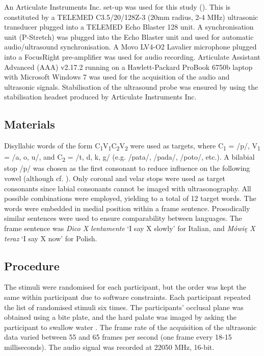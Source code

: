 \documentclass[authoryear, twocolumn]{elsarticle}
\begin{document}
An Articulate Instruments Inc. set-up was used for this study
(). This is constituted by a TELEMED C3.5/20/128Z-3
(20mm radius, 2-4 MHz) ultrasonic transducer plugged into a TELEMED Echo
Blaster 128 unit. A synchronisation unit (P-Stretch) was plugged into
the Echo Blaster unit and used for automatic audio/ultrasound
synchronisation. A Movo LV4-O2 Lavalier microphone plugged into a
FocusRight pre-amplifier was used for audio recording. Articulate
Assistant Advanced (AAA) v2.17.2 running on a Hawlett-Packard ProBook
6750b laptop with Microsoft Windows 7 was used for the acquisition of
the audio and ultrasonic signals. Stabilisation of the ultrasound probe
was ensured by using the stabilisation headset produced by Articulate
Instruments Inc.

\subsection{Materials}\label{materials}

Disyllabic words of the form
C\textsubscript{1}V\textsubscript{1}C\textsubscript{2}V\textsubscript{2}
were used as targets, where C\textsubscript{1} = /p/, V\textsubscript{1}
= /a, o, u/, and C\textsubscript{2} = /t, d, k, g/ (e.g. /pata/, /pada/,
/poto/, etc.). A bilabial stop /p/ was chosen as the first consonant to
reduce influence on the following vowel (although cf.
\citet{vazquez-alvarez2007}). Only coronal and velar stops were used as
target consonants since labial consonants cannot be imaged with
ultrasonography. All possible combinations were employed, yielding to a
total of 12 target words. The words were embedded in medial position
within a frame sentence. Prosodically similar sentences were used to
ensure comparability between languages. The frame sentence was
\emph{Dico X lentamente} `I say X slowly' for Italian, and \emph{Mówię X
teraz} `I say X now' for Polish.

\subsection{Procedure}\label{procedure}

The stimuli were randomised for each participant, but the order was kept
the same within participant due to software constraints. Each
participant repeated the list of randomised stimuli six times. The
participants' occlusal plane was obtained using a bite plate, and the
hard palate was imaged by asking the participant to swallow water
\citep{scobbie2011}. The frame rate of the acquisition of the ultrasonic
data varied between 55 and 65 frames per second (one frame every 18-15
milliseconds). The audio signal was recorded at 22050 MHz, 16-bit.
\end{document}
